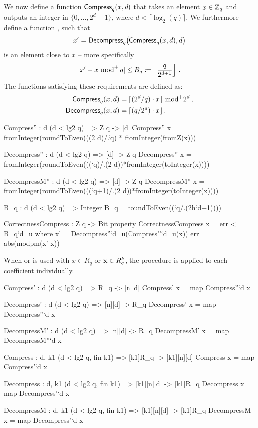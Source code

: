 We now define a function $\mathsf{Compress}_q(x,d)$ that takes an element $x\in\mathbb{Z}_q$ and outputs an integer in $\{0,\dots,2^d-1\}$,
where $d<\lceil \log_2(q) \rceil$. We furthermore define a function \KyberDecompress, such that
\begin{equation}\label{eq:xprime}
x' = \mathsf{Decompress}_q\big(\mathsf{Compress}_q(x,d),d\big)
\end{equation}
is an element close to $x$ -- more specifically
\begin{equation}\label{eq:Bq} 
|x'-x\text{ mod}^\pm\, q|\leq B_q\coloneqq \left\lceil \frac{q}{2^{d+1}}\right\rfloor\,.
\end{equation}
The functions satisfying these requirements are defined as:
\begin{align*}
  \mathsf{Compress}_q(x,d)   &= \lceil (2^d/q)\cdot x \rfloor \text{ mod}^+ 2^d\,,\\
  \mathsf{Decompress}_q(x,d) &= \lceil (q/2^d)\cdot x \rfloor\,.
\end{align*}

\begin{code}
  Compress'' : {d} (d < lg2 q) => Z q -> [d]
  Compress'' x = fromInteger(roundToEven(((2^^`d)/.`q) * fromInteger(fromZ(x))) %

  Decompress'' : {d} (d < lg2 q) => [d] -> Z q 
  Decompress'' x = fromInteger(roundToEven(((`q)/.(2^^`d))*fromInteger(toInteger(x))))

  DecompressM'' : {d} (d < lg2 q) => [d] -> Z q 
  DecompressM'' x = fromInteger(roundToEven(((`q+1)/.(2^^`d))*fromInteger(toInteger(x))))


  B_q : {d} (d < lg2 q) => Integer
  B_q = roundToEven((`q/.(2^^(`d+1))))

  CorrectnessCompress : Z q -> Bit
  property CorrectnessCompress x = err <= B_q`{d_u} where
    x' = Decompress''`{d_u}(Compress''`{d_u}(x))
    err = abs(modpm(x'-x))
\end{code}

When \KyberCompress or \KyberDecompress is used with $x \in R_q$ or $\mathbf{x} \in R_q^k$, 
the procedure is applied to each coefficient individually.

\begin{code}
  Compress' : {d} (d < lg2 q) => R_q -> [n][d]
  Compress' x = map Compress''`{d} x
  
  Decompress' : {d} (d < lg2 q) => [n][d] -> R_q
  Decompress' x = map Decompress''`{d} x
  
  DecompressM' : {d} (d < lg2 q) => [n][d] -> R_q
  DecompressM' x = map DecompressM''`{d} x

  Compress : {d, k1} (d < lg2 q, fin k1) => [k1]R_q -> [k1][n][d]
  Compress x = map Compress'`{d} x
  
  Decompress : {d, k1} (d < lg2 q, fin k1) => [k1][n][d] -> [k1]R_q
  Decompress x = map Decompress'`{d} x

  DecompressM : {d, k1} (d < lg2 q, fin k1) => [k1][n][d] -> [k1]R_q
  DecompressM x = map Decompress'`{d} x
\end{code}

